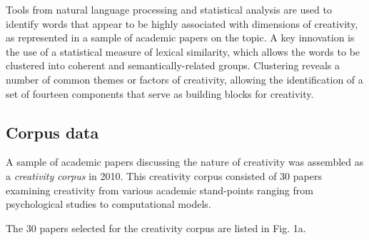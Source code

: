 \documentclass[10pt,letterpaper]{article}
\begin{document}
Tools from natural language processing and statistical analysis are used to identify words that appear to be highly associated with dimensions of creativity, as represented in a sample of academic papers on the topic. A key innovation is the use of a statistical measure of lexical similarity, which allows the words to be clustered into coherent and semantically-related groups. Clustering reveals a number of common themes or factors of creativity, allowing the identification of a set of fourteen components that serve as building blocks for creativity.

\subsection*{Corpus data}\label{corpusData}

A sample of academic papers discussing the nature of creativity was assembled as a {\em creativity corpus\/} in 2010. This creativity corpus consisted of 30 papers examining creativity from various academic stand-points ranging from psychological studies to computational models. 

\vspace{0.25cm}
\begin{center}
\end{center}
\vspace{0.25cm}

The 30 papers selected for the creativity corpus are listed in Fig. 1a. %

\end{document}
